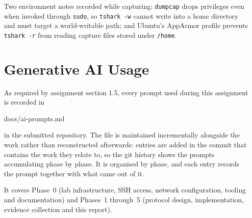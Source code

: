 \documentclass[11pt,a4paper]{article}
\begin{document}
Two environment notes recorded while capturing: \texttt{dumpcap} drops privileges even when invoked
through \texttt{sudo}, so \texttt{tshark -w} cannot write into a home directory and must target a
world-writable path; and Ubuntu's AppArmor profile prevents \texttt{tshark -r} from reading capture
files stored under \texttt{/home}.

\appendix
\section{Generative AI Usage}

As required by assignment section 1.5, every prompt used during this assignment is recorded in

\begin{center}
\ttfamily docs/ai-prompts.md
\end{center}

\noindent
in the submitted repository. The file is maintained incrementally alongside the work rather than
reconstructed afterwards: entries are added in the commit that contains the work they relate to, so
the git history shows the prompts accumulating phase by phase. It is organised by phase, and each
entry records the prompt together with what came out of it.

It covers Phase~0 (lab infrastructure, SSH access, network configuration, tooling and documentation)
and Phases~1 through~5 (protocol design, implementation, evidence collection and this report).
\end{document}
